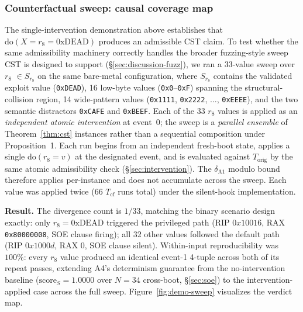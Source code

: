 \documentclass[conference]{IEEEtran}
\newcommand{\Korig}{T_\text{orig}}
\newcommand{\Tcf}{T_\text{cf}}
\newcommand{\scoreS}{\text{score}_S}
\newcommand{\dox}[1]{\text{do}(X{=}#1)}
\begin{document}
\subsubsection{Counterfactual sweep: causal coverage map}
\label{sec:eval-demo-sweep}

The single-intervention demonstration above establishes that
$\dox{r_8{=}\text{0xDEAD}}$ produces an admissible CST claim. To
test whether the same admissibility machinery correctly handles
the broader fuzzing-style sweep CST is designed to support
(\S\ref{sec:discussion-fuzz}), we ran a 33-value sweep over $r_8$
$\in S_{r_8}$ on the same bare-metal configuration, where
$S_{r_8}$ contains the validated exploit value
(\texttt{0xDEAD}), 16 low-byte values (\texttt{0x0}--\texttt{0xF})
spanning the structural-collision region, 14 wide-pattern values
(\texttt{0x1111}, \texttt{0x2222}, $\ldots$, \texttt{0xEEEE}),
and the two semantic distractors \texttt{0xCAFE} and
\texttt{0xBEEF}. Each of the 33 $r_8$ values is applied as an
\emph{independent atomic intervention} at event~0; the sweep is a
\emph{parallel ensemble} of Theorem~\ref{thm:cst} instances rather
than a sequential composition under Proposition~1. Each run begins
from an independent fresh-boot state, applies a single
$\text{do}(r_8{=}v)$ at the designated event, and is evaluated
against $\Korig$ by the same atomic admissibility check
(\S\ref{sec:intervention}). The $\delta_{\text{A1}}$ modulo bound
therefore applies per-instance and does not accumulate across the
sweep. Each value was applied twice (66 $\Tcf$ runs total) under
the silent-hook implementation.

\textbf{Result.} The divergence count is $1/33$, matching the
binary scenario design exactly: only $r_8 = \text{0xDEAD}$
triggered the privileged path (RIP $0x10016$, RAX
\texttt{0x80000008}, SOE clause firing); all 32 other values
followed the default path (RIP $0x1000d$, RAX 0, SOE clause
silent). Within-input reproducibility was $100\%$: every $r_8$
value produced an identical event-1 4-tuple across both of its
repeat passes, extending A4's determinism guarantee from the
no-intervention baseline ($\scoreS{=}1.0000$ over $N{=}34$
cross-boot, \S\ref{sec:soe}) to the intervention-applied case
across the full sweep. Figure~\ref{fig:demo-sweep} visualizes the
verdict map.
\end{document}

